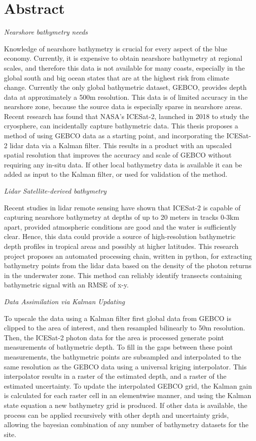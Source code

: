 \chapter*{Abstract}
\noindent\emph{Nearshore bathymetry needs}

Knowledge of nearshore bathymetry is crucial for every aspect of the blue economy. Currently, it is expensive to obtain nearshore bathymetry at regional scales, and therefore this data is not available for many coasts, especially in the global south and big ocean states that are at the highest risk from climate change. Currently the only global bathymetric dataset, GEBCO, provides depth data at approximately a 500m resolution. This data is of limited accuracy in the nearshore zone, because the source data is especially sparse in nearshore areas. Recent research has found that NASA's ICESat-2, launched in 2018 to study the cryosphere, can incidentally capture bathymetric data. This thesis proposes a method of using GEBCO data as a starting point, and incorporating the ICESat-2 lidar data via a Kalman filter. This results in a product with an upscaled spatial resolution that improves the accuracy and scale of GEBCO without requiring any in-situ data. If other local bathymetry data is available it can be added as input to the Kalman filter, or used for validation of the method. 

\noindent\emph{Lidar Satellite-derived bathymetry}

Recent studies in lidar remote sensing have shown that ICESat-2 is capable of capturing nearshore bathymetry at depths of up to 20 meters in tracks 0-3km apart, provided atmospheric conditions are good and the water is sufficiently clear. Hence, this data could provide a source of high-resolution bathymetric depth profiles in tropical areas and possibly at higher latitudes. This research project proposes an automated processing chain, written in python, for extracting bathymetry points from the lidar data based on the density of the photon returns in the underwater zone. This method can reliably identify transects containing bathymetric signal with an RMSE of x-y. 


\noindent\emph{Data Assimilation via Kalman Updating}

To upscale the data using a Kalman filter first global data from GEBCO is clipped to the area of interest, and then resampled bilinearly to 50m resolution. Then, the ICESat-2 photon data for the area is processed generate point measurements of bathymetric depth. To fill in the gaps between these point measurements, the bathymetric points are subsampled and interpolated to the same resolution as the GEBCO data using a universal kriging interpolator. This interpolator results in a raster of the estimated depth, and a raster of the estimated uncertainty. To update the interpolated GEBCO grid, the Kalman gain is calculated for each raster cell in an elementwise manner, and using the Kalman state equation a new bathymetry grid is produced. If other data is available, the process can be applied recursively with other depth and uncertainty grids, allowing the bayesian combination of any number of bathymetry datasets for the site.


